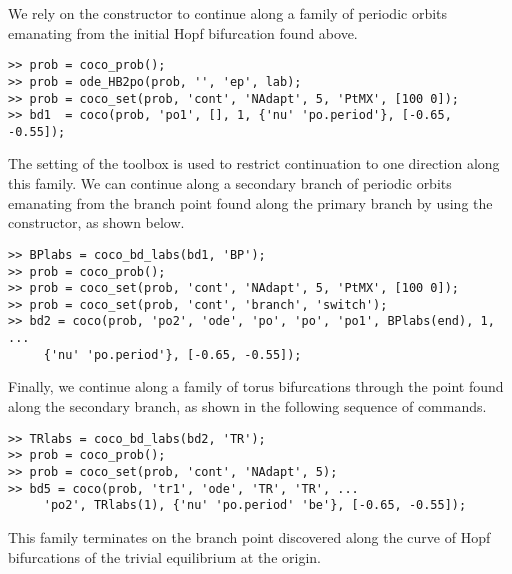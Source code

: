 We rely on the  constructor to continue along a family of periodic orbits emanating from the initial Hopf bifurcation found above.
\begin{lstlisting}[language=coco-highlight]
>> prob = coco_prob();
>> prob = ode_HB2po(prob, '', 'ep', lab);
>> prob = coco_set(prob, 'cont', 'NAdapt', 5, 'PtMX', [100 0]);
>> bd1  = coco(prob, 'po1', [], 1, {'nu' 'po.period'}, [-0.65, -0.55]);
\end{lstlisting}
The  setting of the  toolbox is used to restrict continuation to one direction along this family. We can continue along a secondary branch of periodic orbits emanating from the branch point found along the primary branch by using the  constructor, as shown below.
\begin{lstlisting}[language=coco-highlight]
>> BPlabs = coco_bd_labs(bd1, 'BP');
>> prob = coco_prob();
>> prob = coco_set(prob, 'cont', 'NAdapt', 5, 'PtMX', [100 0]);
>> prob = coco_set(prob, 'cont', 'branch', 'switch');
>> bd2 = coco(prob, 'po2', 'ode', 'po', 'po', 'po1', BPlabs(end), 1, ...
     {'nu' 'po.period'}, [-0.65, -0.55]);
\end{lstlisting}
Finally, we continue along a family of torus bifurcations through the point found along the secondary branch, as shown in the following sequence of commands.
\begin{lstlisting}[language=coco-highlight]
>> TRlabs = coco_bd_labs(bd2, 'TR');
>> prob = coco_prob();
>> prob = coco_set(prob, 'cont', 'NAdapt', 5);
>> bd5 = coco(prob, 'tr1', 'ode', 'TR', 'TR', ...
     'po2', TRlabs(1), {'nu' 'po.period' 'be'}, [-0.65, -0.55]);
\end{lstlisting}
This family terminates on the branch point discovered along the curve of Hopf bifurcations of the trivial equilibrium at the origin.\\
\medskip


